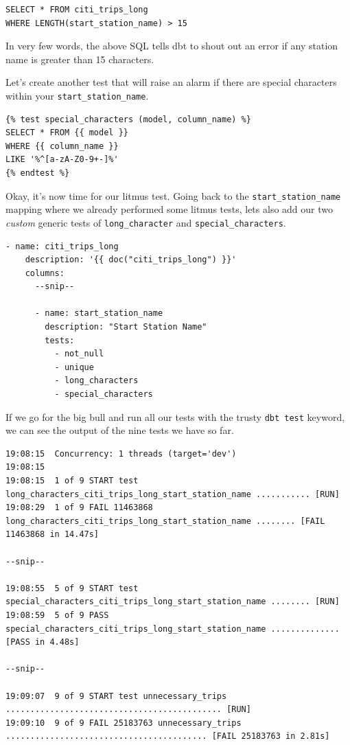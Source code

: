 \documentclass[
]{book}
\begin{document}
\begin{verbatim}
SELECT * FROM citi_trips_long
WHERE LENGTH(start_station_name) > 15 
\end{verbatim}

In very few words, the above SQL tells dbt to shout out an error if any station name is greater than 15 characters.

Let's create another test that will raise an alarm if there are special characters within your \texttt{start\_station\_name}.

\begin{verbatim}
{% test special_characters (model, column_name) %}
SELECT * FROM {{ model }}
WHERE {{ column_name }}
LIKE '%^[a-zA-Z0-9+-]%'
{% endtest %}
\end{verbatim}

Okay, it's now time for our litmus test. Going back to the \texttt{start\_station\_name} mapping where we already performed some litmus tests, lets also add our two \emph{custom} generic tests of \texttt{long\_character} and \texttt{special\_characters}.

\begin{verbatim}
- name: citi_trips_long
    description: '{{ doc("citi_trips_long") }}'
    columns:
      --snip--

      - name: start_station_name
        description: "Start Station Name"
        tests:
          - not_null
          - unique
          - long_characters
          - special_characters
\end{verbatim}

If we go for the big bull and run all our tests with the trusty \texttt{dbt\ test} keyword, we can see the output of the nine tests we have so far.

\begin{verbatim}
19:08:15  Concurrency: 1 threads (target='dev')
19:08:15  
19:08:15  1 of 9 START test long_characters_citi_trips_long_start_station_name ........... [RUN]
19:08:29  1 of 9 FAIL 11463868 long_characters_citi_trips_long_start_station_name ........ [FAIL 11463868 in 14.47s]

--snip--

19:08:55  5 of 9 START test special_characters_citi_trips_long_start_station_name ........ [RUN]
19:08:59  5 of 9 PASS special_characters_citi_trips_long_start_station_name .............. [PASS in 4.48s]

--snip--

19:09:07  9 of 9 START test unnecessary_trips ............................................ [RUN]
19:09:10  9 of 9 FAIL 25183763 unnecessary_trips ......................................... [FAIL 25183763 in 2.81s]
\end{verbatim}
\end{document}
